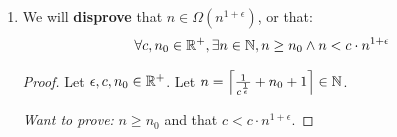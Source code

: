 \documentclass[12pt]{article}
\theoremstyle{definition}
\begin{document}
\begin{enumerate}
\begin{proof}
            Moreover, since the aforementioned terms are greater than 0, we can perform the following arithmetic:
            \begin{align*}
                \bigg(n - \bigg(\nnf\bigg) \bigg) \cdot \bigg(n - \bigg(\nnfs\bigg) \bigg) &\geq 0\\[1ex]
                n^2 - n \cdot \bigg(\nnfs\bigg) - n \cdot \bigg(\nnf\bigg) + \bigg(\nnf\bigg) \cdot \bigg(\nnfs\bigg) &\geq 0\\[1ex]
                n^2 + \frac{-n + n \cdot \nnsq - n - n \cdot \nnsq}{2} + \frac{1^2 - (\nnsq)^2}{4} &\geq 0\\[1ex]
                n^2 - \frac{2n}{2} + \frac{1 - 1 - 4k}{4} &\geq 0\\[1ex]
                n^2 - n - k &\geq 0\\[1ex]
                n^2 - n - k &\geq 0\\[1ex]
                n^2 &\geq n + k
            \end{align*}
            Using \textbf{Fact (2)}, we can also conclude that:
            \begin{align*}
                n^2 \geq n + k &\iff \log_2(n+k) \leq \log_2(n^2) \\
                &\iff \log_2(n+k) \leq 2 \cdot \log_2(n) \\
                &\iff \log_2(n+k) \leq c \cdot \log_2(n) \\
            \end{align*}
            \emph{Thus, we have proven that:  $\log_2(k+n) \leq \log_2(n^2)$.}
        \end{proof}
    \newcommand{\e}{\epsilon}
    \newcommand{\bbn}{\ceil{\frac{1}{c^{\frac{1}{\e}}}+ n_0 + 1}}
    \newcommand{\bb}{\frac{1}{c^{\frac{1}{\e}}}}
     
    \item We will \textbf{disprove} that $n \in \Omega(n^{1+\e})$, or that: 
        \begin{align*}
            \forall c, n_0 \in \R^+, \exists n \in \N, n \geq n_0 \land n < c \cdot n^{1 + \e}
        \end{align*}
        \begin{proof}
            Let $\e, c, n_0 \in \R^+$.
            Let $n = \bbn \in \N$.
            
            \emph{Want to prove: }$n \geq n_0$ and that $c < c \cdot n^{1 + \e}$.
            

\end{proof}
\end{enumerate}
\end{document}
